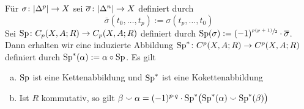 \begin{lemma}[{name=[Spiegelung von singulären Simplizes]},label=spiegelung_simplex]
	Für $\sigma \colon \abs{\Delta^p} \to X$ sei $\overline{\sigma} \colon \abs{\Delta^n} \to X$ definiert durch 
	\[
		\overline{\sigma}(t_0, \ldots , t_p ) :=  \sigma(t_p, \ldots ,t_0)
	\]
	Sei $\Sp \colon C_p(X,A;R) \to C_p(X,A;R)$ definiert durch $\Sp(\sigma) := (-1)^{\sfrac{p(p+1)}{2}} \cdot \overline{\sigma}$. 
	Dann erhalten wir eine induzierte Abbildung $\Sp^* \colon C^p(X,A;R) \to C^p(X,A;R)$ definiert durch $\Sp^*(\alpha) := \alpha \circ \Sp$. Es gilt
	\begin{enumerate}[a)]
		\item $\Sp$ ist eine Kettenabbildung und $\Sp^*$ ist eine Kokettenabbildung
		\item Ist $R$ kommutativ, so gilt $\beta \cupp \alpha = (-1)^{p \cdot q}\cdot \Sp^*\enbrace[\big]{\Sp^*(\alpha) \cupp \Sp^*(\beta)}$
	\end{enumerate}
\end{lemma}
